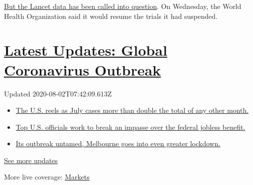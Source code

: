 \href{https://cdf.nejm.org/services/GetOnlineFirstPDF.aspx?DOI=NEJMoa2016638}{But
the Lancet data has been called into question}. On Wednesday, the World
Health Organization said it would resume the trials it had suspended.

\hypertarget{latest-updates-global-coronavirus-outbreak}{%
\section{\texorpdfstring{\href{https://www.nytimes3xbfgragh.onion/2020/08/01/world/coronavirus-covid-19.html?action=click\&pgtype=Article\&state=default\&region=MAIN_CONTENT_1\&context=storylines_live_updates}{Latest
Updates: Global Coronavirus
Outbreak}}{Latest Updates: Global Coronavirus Outbreak}}\label{latest-updates-global-coronavirus-outbreak}}

Updated 2020-08-02T07:42:09.613Z

\begin{itemize}
\tightlist
\item
  \href{https://www.nytimes3xbfgragh.onion/2020/08/01/world/coronavirus-covid-19.html?action=click\&pgtype=Article\&state=default\&region=MAIN_CONTENT_1\&context=storylines_live_updates\#link-34047410}{The
  U.S. reels as July cases more than double the total of any other
  month.}
\item
  \href{https://www.nytimes3xbfgragh.onion/2020/08/01/world/coronavirus-covid-19.html?action=click\&pgtype=Article\&state=default\&region=MAIN_CONTENT_1\&context=storylines_live_updates\#link-780ec966}{Top
  U.S. officials work to break an impasse over the federal jobless
  benefit.}
\item
  \href{https://www.nytimes3xbfgragh.onion/2020/08/01/world/coronavirus-covid-19.html?action=click\&pgtype=Article\&state=default\&region=MAIN_CONTENT_1\&context=storylines_live_updates\#link-2bc8948}{Its
  outbreak untamed, Melbourne goes into even greater lockdown.}
\end{itemize}

\href{https://www.nytimes3xbfgragh.onion/2020/08/01/world/coronavirus-covid-19.html?action=click\&pgtype=Article\&state=default\&region=MAIN_CONTENT_1\&context=storylines_live_updates}{See
more updates}

More live coverage:
\href{https://www.nytimes3xbfgragh.onion/live/2020/07/31/business/stock-market-today-coronavirus?action=click\&pgtype=Article\&state=default\&region=MAIN_CONTENT_1\&context=storylines_live_updates}{Markets}

